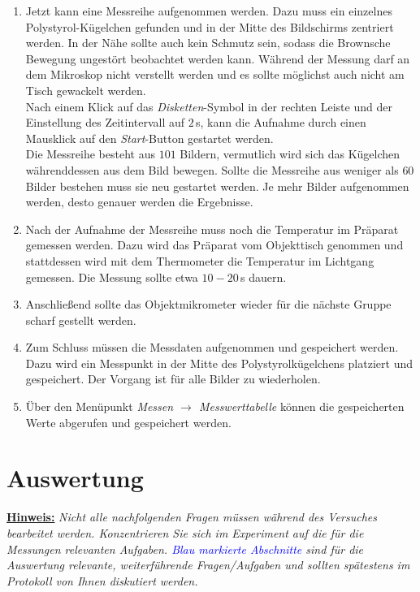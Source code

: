 \documentclass[a4paper, 12pt]{scrartcl}
\begin{document}
\begin{enumerate}
  \item Jetzt kann eine Messreihe aufgenommen werden. Dazu muss ein einzelnes Polystyrol-Kügelchen gefunden und in der Mitte des Bildschirms zentriert werden. In der Nähe sollte auch kein Schmutz sein, sodass die Brownsche Bewegung ungestört beobachtet werden kann. Während der Messung darf an dem Mikroskop nicht verstellt werden und es sollte möglichst auch nicht am Tisch gewackelt werden.\\
  Nach einem Klick auf das \emph{Disketten}-Symbol in der rechten Leiste und der Einstellung des Zeitintervall  auf $2 \,$s, kann die Aufnahme durch einen Mausklick auf den \emph{Start}-Button gestartet werden.\\
  Die Messreihe besteht aus $101$ Bildern, vermutlich wird sich das Kügelchen währenddessen aus dem Bild bewegen. Sollte die Messreihe aus weniger als $60$ Bilder bestehen muss sie neu gestartet werden. Je mehr Bilder aufgenommen werden, desto genauer werden die Ergebnisse.

  \item Nach der Aufnahme der Messreihe muss noch die Temperatur im Präparat gemessen werden. Dazu wird das Präparat vom Objekttisch genommen und stattdessen wird mit dem Thermometer die Temperatur im Lichtgang gemessen. Die Messung sollte etwa $10 - 20\,$s dauern.

  \item Anschließend sollte das Objektmikrometer wieder für die nächste Gruppe scharf gestellt werden.

  \item Zum Schluss müssen die Messdaten aufgenommen und gespeichert werden.
  Dazu wird ein Messpunkt in der Mitte des Polystyrolkügelchens platziert und gespeichert. Der Vorgang ist für alle Bilder zu wiederholen.

  \item Über den Menüpunkt \emph{Messen $\rightarrow$ Messwerttabelle} können die gespeicherten Werte abgerufen und gespeichert werden.

\end{enumerate}
\section*{Auswertung}

\textbf{\underline{Hinweis:}}\textit{ Nicht alle nachfolgenden Fragen müssen während des Versuches bearbeitet werden. Konzentrieren Sie sich im Experiment auf die für die Messungen relevanten Aufgaben. \textcolor{blue}{Blau markierte Abschnitte} sind für die Auswertung relevante, weiterführende Fragen/Aufgaben und sollten spätestens im Protokoll von Ihnen diskutiert werden.}\newline
\end{document}
